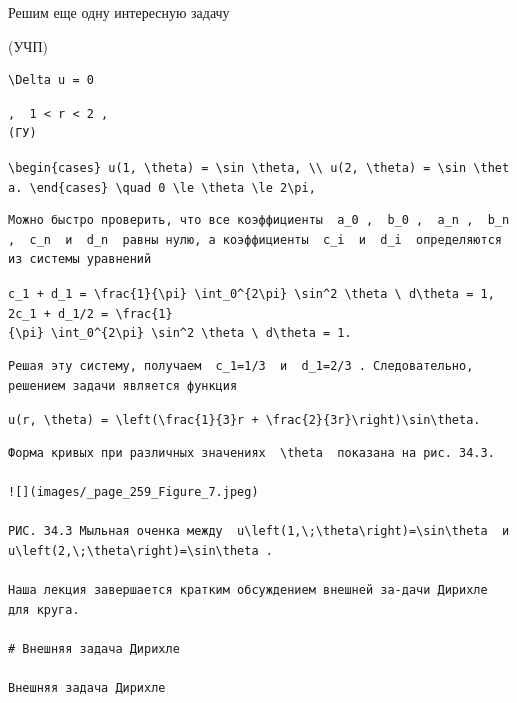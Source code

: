 \documentclass[
  ukrainian,
]{article}
\begin{document}
Решим еще одну интересную задачу

(УЧП)

\begin{verbatim}
\Delta u = 0
\end{verbatim}

\begin{verbatim}
,  1 < r < 2 ,  
(ГУ)
\end{verbatim}

\texttt{\textbackslash{}begin\{cases\}\ u(1,\ \textbackslash{}theta)\ =\ \textbackslash{}sin\ \textbackslash{}theta,\ \textbackslash{}\textbackslash{}\ u(2,\ \textbackslash{}theta)\ =\ \textbackslash{}sin\ \textbackslash{}theta.\ \textbackslash{}end\{cases\}\ \textbackslash{}quad\ 0\ \textbackslash{}le\ \textbackslash{}theta\ \textbackslash{}le\ 2\textbackslash{}pi,}

\begin{verbatim}
Можно быстро проверить, что все коэффициенты  a_0 ,  b_0 ,  a_n ,  b_n ,  c_n  и  d_n  равны нулю, а коэффициенты  c_i  и  d_i  определяются из системы уравнений
\end{verbatim}

\texttt{c\_1\ +\ d\_1\ =\ \textbackslash{}frac\{1\}\{\textbackslash{}pi\}\ \textbackslash{}int\_0\^{}\{2\textbackslash{}pi\}\ \textbackslash{}sin\^{}2\ \textbackslash{}theta\ \textbackslash{}\ d\textbackslash{}theta\ =\ 1,}
\texttt{2c\_1\ +\ d\_1/2\ =\ \textbackslash{}frac\{1\}\{\textbackslash{}pi\}\ \textbackslash{}int\_0\^{}\{2\textbackslash{}pi\}\ \textbackslash{}sin\^{}2\ \textbackslash{}theta\ \textbackslash{}\ d\textbackslash{}theta\ =\ 1.}

\begin{verbatim}
Решая эту систему, получаем  c_1=1/3  и  d_1=2/3 . Следовательно, решением задачи является функция
\end{verbatim}

\texttt{u(r,\ \textbackslash{}theta)\ =\ \textbackslash{}left(\textbackslash{}frac\{1\}\{3\}r\ +\ \textbackslash{}frac\{2\}\{3r\}\textbackslash{}right)\textbackslash{}sin\textbackslash{}theta.}

\begin{verbatim}
Форма кривых при различных значениях  \theta  показана на рис. 34.3.

![](images/_page_259_Figure_7.jpeg)

РИС. 34.3 Мыльная оченка между  u\left(1,\;\theta\right)=\sin\theta  и  u\left(2,\;\theta\right)=\sin\theta .

Наша лекция завершается кратким обсуждением внешней за-дачи Дирихле для круга.

# Внешняя задача Дирихле

Внешняя задача Дирихле
\end{verbatim}
\end{document}
